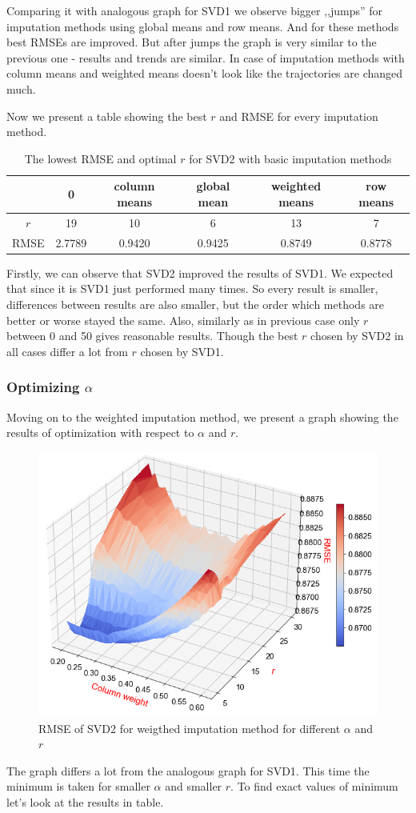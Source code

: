 \documentclass[10pt]{amsart}
\begin{document}
Comparing it with analogous graph for SVD1 we observe bigger ,,jumps'' for imputation methods using global means and row means.
And for these methods best RMSEs are improved.
But after jumps the graph is very similar to the previous one - results and trends are similar.
In case of imputation methods with column means and weighted means doesn't look like the trajectories are changed much.

Now we present a table showing the best $r$ and RMSE for every imputation method.
\begin{table}[H]
\begin{tabular}{c|ccccc}
& 0 & column means & global mean & weighted means & row means \\
\hline
$r$ & 19 & 10 & 6 & 13 & 7 \\
RMSE & 2.7789 & 0.9420 & 0.9425 & 0.8749 & 0.8778 \\
\end{tabular}
\caption{The lowest RMSE and optimal $r$ for SVD2 with basic imputation methods}
\end{table}

Firstly, we can observe that SVD2 improved the results of SVD1.
We expected that since it is SVD1 just performed many times.
So every result is smaller, differences between results are also smaller, but the order which methods are better or worse stayed the same.
Also, similarly as in previous case only $r$ between 0 and 50 gives reasonable results.
Though the best $r$ chosen by SVD2 in all cases differ a lot from $r$ chosen by SVD1.

\subsubsection*{Optimizing $\alpha$}
Moving on to the weighted imputation method, we present a graph showing the results of optimization with respect to $\alpha$ and $r$.
\begin{figure}[H]
\includegraphics[scale = 0.54]{svd2_r_w2}
\caption{RMSE of SVD2 for weigthed imputation method for different $\alpha$ and $r$}
\end{figure}
The graph differs a lot from the analogous graph for SVD1.
This time the minimum is taken for smaller $\alpha$ and smaller $r$.
To find exact values of minimum let's look at the results in table.
\end{document}
